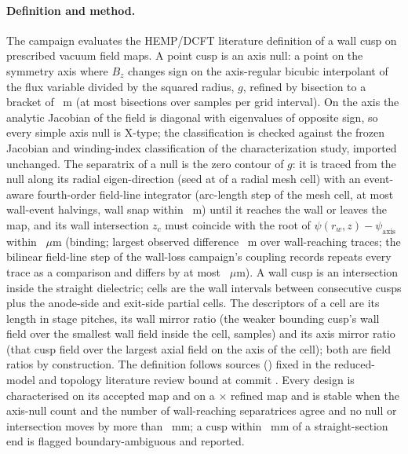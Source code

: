 \paragraph{Definition and method.}
The campaign evaluates the HEMP/DCFT literature definition of a wall cusp on
prescribed vacuum field maps. A point cusp is an
axis null: a point on the symmetry axis where $B_z$ changes sign on the
axis-regular bicubic interpolant of the flux variable divided by the squared
radius, $g$, refined by bisection to a bracket of \CtvAxisBracketTolerance{}~m
(at most \CtvAxisMaxBisections{} bisections over \CtvAxisSamplesPerInterval{}
samples per grid interval). On the axis the analytic Jacobian of the field is
diagonal with eigenvalues of opposite sign, so every simple axis null is X-type;
the classification is checked against the frozen Jacobian and winding-index
classification of the characterization study, imported unchanged. The
separatrix of a null is the zero contour of $g$: it is traced from the null
along its radial eigen-direction (seed at \CtvSeedRadiusCellFraction{} of a
radial mesh cell) with an event-aware fourth-order field-line integrator
(arc-length step \CtvTraceStepCellFraction{} of the mesh cell, at most
\CtvWallEventMaxHalvings{} wall-event halvings, wall snap within
\CtvWallToleranceM{}~m) until it reaches the wall or leaves the map, and its
wall intersection $z_c$ must coincide with the root of
$\psi(r_w,z)-\psi_{\mathrm{axis}}$ within \CtvTraceFluxRootToleranceUm{}~$\mu$m
(binding; largest observed difference \CtvFluxRootMaxDiff{}~m over
\CtvWallTraceCount{} wall-reaching traces; the bilinear field-line step of the
wall-loss campaign's coupling records repeats every trace as a comparison and
differs by at most \CtvVFourBilinearMaxUm{}~$\mu$m). A wall cusp is an
intersection inside the straight dielectric; cells are the wall intervals
between consecutive cusps plus the anode-side and exit-side partial cells. The
descriptors of a cell are its length in stage pitches, its wall mirror ratio
(the weaker bounding cusp's wall field over the smallest wall field inside the
cell, \CtvWallSamplesPerCell{} samples) and its axis mirror ratio (that cusp
field over the largest axial field on the axis of the cell); both are field
ratios by construction. The definition follows \CtvLiteratureSourceCount{}
sources (\CtvLiteratureKeys) fixed in the reduced-model and topology literature
review bound at commit \texttt{\CtvLiteratureCommit}. Every
design is characterised on its accepted map and on a
\CtvRefinementFactor$\times$ refined map and is stable when the axis-null count
and the number of wall-reaching separatrices agree and no null or intersection
moves by more than \CtvStabilityToleranceMm{}~mm; a cusp within
\CtvBoundaryAmbiguityToleranceMm{}~mm of a straight-section end is flagged
boundary-ambiguous and reported.

